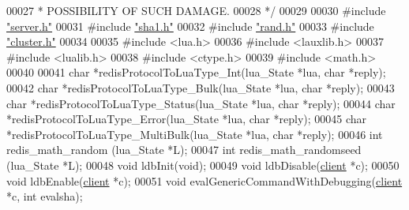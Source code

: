 \begin{DoxyCode}
00027 \textcolor{comment}{ * POSSIBILITY OF SUCH DAMAGE.}
00028 \textcolor{comment}{ */}
00029 
00030 \textcolor{preprocessor}{#}\textcolor{preprocessor}{include} \hyperlink{server_8h}{"server.h"}
00031 \textcolor{preprocessor}{#}\textcolor{preprocessor}{include} \hyperlink{sha1_8h}{"sha1.h"}
00032 \textcolor{preprocessor}{#}\textcolor{preprocessor}{include} \hyperlink{rand_8h}{"rand.h"}
00033 \textcolor{preprocessor}{#}\textcolor{preprocessor}{include} \hyperlink{cluster_8h}{"cluster.h"}
00034 
00035 \textcolor{preprocessor}{#}\textcolor{preprocessor}{include} \textcolor{preprocessor}{<}\textcolor{preprocessor}{lua}\textcolor{preprocessor}{.}\textcolor{preprocessor}{h}\textcolor{preprocessor}{>}
00036 \textcolor{preprocessor}{#}\textcolor{preprocessor}{include} \textcolor{preprocessor}{<}\textcolor{preprocessor}{lauxlib}\textcolor{preprocessor}{.}\textcolor{preprocessor}{h}\textcolor{preprocessor}{>}
00037 \textcolor{preprocessor}{#}\textcolor{preprocessor}{include} \textcolor{preprocessor}{<}\textcolor{preprocessor}{lualib}\textcolor{preprocessor}{.}\textcolor{preprocessor}{h}\textcolor{preprocessor}{>}
00038 \textcolor{preprocessor}{#}\textcolor{preprocessor}{include} \textcolor{preprocessor}{<}\textcolor{preprocessor}{ctype}\textcolor{preprocessor}{.}\textcolor{preprocessor}{h}\textcolor{preprocessor}{>}
00039 \textcolor{preprocessor}{#}\textcolor{preprocessor}{include} \textcolor{preprocessor}{<}\textcolor{preprocessor}{math}\textcolor{preprocessor}{.}\textcolor{preprocessor}{h}\textcolor{preprocessor}{>}
00040 
00041 \textcolor{keywordtype}{char} *redisProtocolToLuaType\_Int(lua\_State *lua, \textcolor{keywordtype}{char} *reply);
00042 \textcolor{keywordtype}{char} *redisProtocolToLuaType\_Bulk(lua\_State *lua, \textcolor{keywordtype}{char} *reply);
00043 \textcolor{keywordtype}{char} *redisProtocolToLuaType\_Status(lua\_State *lua, \textcolor{keywordtype}{char} *reply);
00044 \textcolor{keywordtype}{char} *redisProtocolToLuaType\_Error(lua\_State *lua, \textcolor{keywordtype}{char} *reply);
00045 \textcolor{keywordtype}{char} *redisProtocolToLuaType\_MultiBulk(lua\_State *lua, \textcolor{keywordtype}{char} *reply);
00046 \textcolor{keywordtype}{int} redis\_math\_random (lua\_State *L);
00047 \textcolor{keywordtype}{int} redis\_math\_randomseed (lua\_State *L);
00048 \textcolor{keywordtype}{void} ldbInit(\textcolor{keywordtype}{void});
00049 \textcolor{keywordtype}{void} ldbDisable(\hyperlink{structclient}{client} *c);
00050 \textcolor{keywordtype}{void} ldbEnable(\hyperlink{structclient}{client} *c);
00051 \textcolor{keywordtype}{void} evalGenericCommandWithDebugging(\hyperlink{structclient}{client} *c, \textcolor{keywordtype}{int} evalsha);

\end{DoxyCode}
